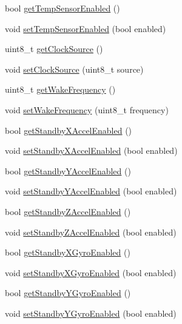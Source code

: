 \begin{DoxyCompactItemize}
\item 
bool \mbox{\hyperlink{class_m_p_u6050_a31f588beab6760258212c65725eba336}{get\+Temp\+Sensor\+Enabled}} ()
\item 
void \mbox{\hyperlink{class_m_p_u6050_a0113871802e88c80fe69ce1f607987ff}{set\+Temp\+Sensor\+Enabled}} (bool enabled)
\item 
uint8\+\_\+t \mbox{\hyperlink{class_m_p_u6050_a8ed670258a805807b5102cdc5d0996a8}{get\+Clock\+Source}} ()
\item 
void \mbox{\hyperlink{class_m_p_u6050_a4c1cd147d038e024bdeaa053c4d77734}{set\+Clock\+Source}} (uint8\+\_\+t source)
\item 
uint8\+\_\+t \mbox{\hyperlink{class_m_p_u6050_a249a905ae4572a462414f2d94236258a}{get\+Wake\+Frequency}} ()
\item 
void \mbox{\hyperlink{class_m_p_u6050_a62495e89f4787e6b18f0f795cef2b7cd}{set\+Wake\+Frequency}} (uint8\+\_\+t frequency)
\item 
bool \mbox{\hyperlink{class_m_p_u6050_a99261a04739fdb7a9a1c5b67ce3e710e}{get\+Standby\+X\+Accel\+Enabled}} ()
\item 
void \mbox{\hyperlink{class_m_p_u6050_af4df87fd2e87f41d06706cfd5bbc2a2c}{set\+Standby\+X\+Accel\+Enabled}} (bool enabled)
\item 
bool \mbox{\hyperlink{class_m_p_u6050_a104f2ec438d745f8fdeec202bae09b48}{get\+Standby\+Y\+Accel\+Enabled}} ()
\item 
void \mbox{\hyperlink{class_m_p_u6050_a7ce7d3299479eb66518acf0697132835}{set\+Standby\+Y\+Accel\+Enabled}} (bool enabled)
\item 
bool \mbox{\hyperlink{class_m_p_u6050_adae85612e047c4c7f0c3b7110fc92956}{get\+Standby\+Z\+Accel\+Enabled}} ()
\item 
void \mbox{\hyperlink{class_m_p_u6050_ac5fd917549d2ed0f12b8a17167271199}{set\+Standby\+Z\+Accel\+Enabled}} (bool enabled)
\item 
bool \mbox{\hyperlink{class_m_p_u6050_acb5fde4167aa54fbbe84706d577a48a6}{get\+Standby\+X\+Gyro\+Enabled}} ()
\item 
void \mbox{\hyperlink{class_m_p_u6050_ac1c6d8f623a9ca00a4ddc50f6615b977}{set\+Standby\+X\+Gyro\+Enabled}} (bool enabled)
\item 
bool \mbox{\hyperlink{class_m_p_u6050_aaad2985f8d22aec123f1e1dabcdd427a}{get\+Standby\+Y\+Gyro\+Enabled}} ()
\item 
void \mbox{\hyperlink{class_m_p_u6050_ab0973d64b7132188539b07991f7ea1f0}{set\+Standby\+Y\+Gyro\+Enabled}} (bool enabled)
\item 

\end{DoxyCompactItemize}
